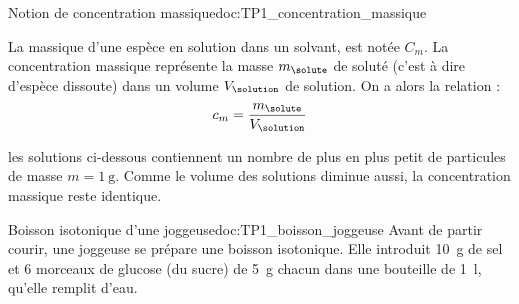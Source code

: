 \begin{doc}{Notion de concentration massique}{doc:TP1_concentration_massique}
  \begin{importants}
    La  massique d’une espèce en solution dans un solvant, est notée $C_m$.
    La concentration massique représente la masse $m_\solute$ de soluté (c'est à dire d'espèce dissoute) dans un volume $V_\solution$ de solution.
    On a alors la relation :
    \begin{equation*}
      c_m = \dfrac{ m_\solute }{ V_\solution }
    \end{equation*}
  \end{importants}

  \exemples les solutions ci-dessous contiennent un nombre de plus en plus petit de particules de masse $m = \qty{1}{\g}$.
  Comme le volume des solutions diminue aussi, la concentration massique reste identique.

\end{doc}


\begin{doc}{Boisson isotonique d'une joggeuse}{doc:TP1_boisson_joggeuse}
  Avant de partir courir, une joggeuse se prépare une boisson isotonique.
  Elle introduit \qty{10}{\g} de sel  et 6 morceaux de glucose  (du sucre) de \qty{5}{\g} chacun dans une bouteille de \qty{1}{\litre}, qu'elle remplit d'eau.
\end{doc}


